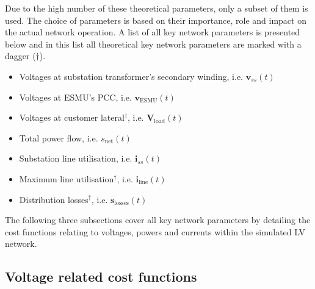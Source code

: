 Due to the high number of these theoretical parameters, only a subset of them is used.
The choice of parameters is based on their importance, role and impact on the actual network operation.
A list of all key network parameters is presented below and in this list all theoretical key network parameters are marked with a dagger ($\dagger$).

\begin{itemize}
	\item Voltages at substation transformer's secondary winding, i.e. $\textbf{v}_{ss}(t)$
	\item Voltages at ESMU's PCC, i.e. $\textbf{v}_\text{ESMU}(t)$
	\item Voltages at customer lateral$^{\dagger}$, i.e. $\textbf{V}_\text{load}(t)$
	\item Total power flow, i.e. $s_\text{net}(t)$
	\item Substation line utilisation, i.e. $\textbf{i}_{ss}(t)$
	\item Maximum line utilisation$^{\dagger}$, i.e. $\textbf{i}_\text{line}(t)$
	\item Distribution losses$^{\dagger}$, i.e. $\textbf{s}_\text{losses}(t)$
\end{itemize}


The following three subsections cover all key network parameters by detailing the cost functions relating to voltages, powers and currents within the simulated LV network.

\subsection{Voltage related cost functions}
\label{ch1:subsec:voltages-related-cost-functions}


